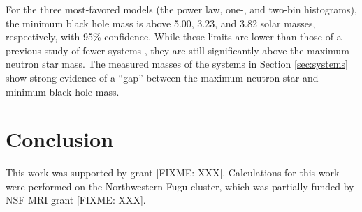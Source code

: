 \documentclass[preprint]{aastex}
\newcommand{\fixme}[1]{[FIXME: #1]}
\begin{document}
For the three most-favored models (the power law, one-, and two-bin
histograms), the minimum black hole mass is above 5.00, 3.23, and 3.82
solar masses, respectively, with 95\% confidence.  While these limits
are lower than those of a previous study of fewer systems
\citep{Bailyn1998}, they are still significantly above the maximum
neutron star mass.  The measured masses of the systems in Section
\ref{sec:systems} show strong evidence of a ``gap'' between the
maximum neutron star and minimum black hole mass.

\section{Conclusion}

\acknowledgements

This work was supported by grant \fixme{XXX}.  Calculations for this
work were performed on the Northwestern Fugu cluster, which was
partially funded by NSF MRI grant \fixme{XXX}.


\end{document}
